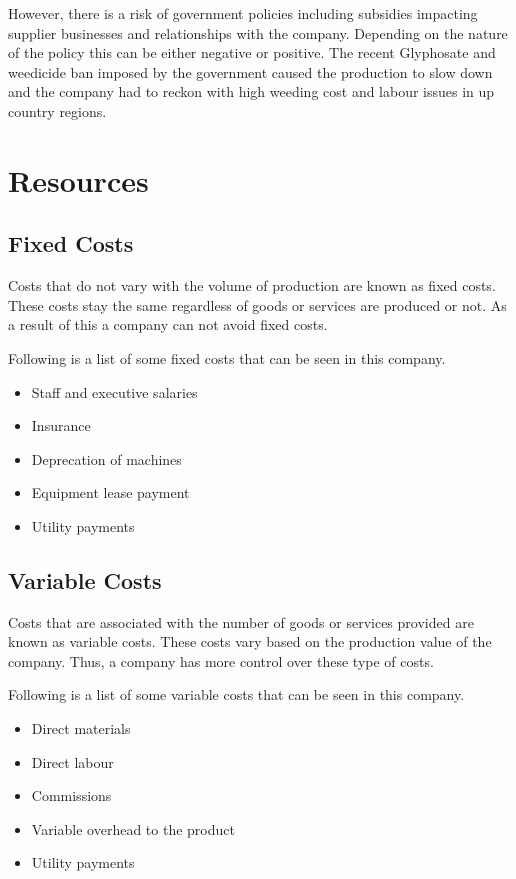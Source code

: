 \documentclass[12pt]{report}
\begin{document}
However, there is a risk of government policies including subsidies impacting supplier businesses and relationships with the company. Depending on the nature of the policy this can be either negative or positive. The recent Glyphosate and weedicide ban imposed by the government caused the production to slow down and the company had to reckon with high weeding cost and labour issues in up country regions.

\chapter{Resources}

\section{Fixed Costs}
Costs that do not vary with the volume of production are known as fixed costs. These costs stay the same regardless of goods or services are produced or not. As a result of this a company can not avoid fixed costs.

Following is a list of some fixed costs that can be seen in this company.

\begin{itemize}
	\item {Staff and executive salaries}
	\item {Insurance}
	\item {Deprecation of machines}
	\item {Equipment lease payment}
	\item {Utility payments}
\end{itemize}

\section{Variable Costs}
Costs that are associated with the number of goods or services provided are known as variable costs. These costs vary based on the production value of the company. Thus, a company has more control over these type of costs.


Following is a list of some variable costs that can be seen in this company.

\begin{itemize}
	\item {Direct materials}
	\item {Direct labour}
	\item {Commissions}
	\item {Variable overhead to the product}
	\item {Utility payments}
\end{itemize}
\end{document}
